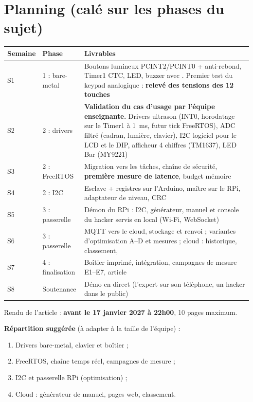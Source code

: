 \documentclass[11pt,a4paper]{article}
\newcommand{\code}[1]{\texttt{\detokenize{#1}}}
\begin{document}
\section{Planning (calé sur les phases du sujet)}
\label{sec:planning}

\begin{center}\small
\begin{tabularx}{\linewidth}{P{1.6cm}P{2.6cm}L}
\toprule
\textbf{Semaine} & \textbf{Phase} & \textbf{Livrables} \\
\midrule
S1 & 1 : bare-metal & Boutons lumineux PCINT2/PCINT0 + anti-rebond, Timer1 CTC, LED, buzzer avec \code{tone()}. Premier test du keypad analogique : \textbf{relevé des tensions des 12 touches} \\
S2 & 2 : drivers & \textbf{Validation du cas d'usage par l'équipe enseignante.} Drivers ultrason (INT0, horodatage sur le Timer1 à 1~ms, futur tick FreeRTOS), ADC filtré (cadran, lumière, clavier), I2C logiciel pour le LCD et le DIP, afficheur 4 chiffres (TM1637), LED Bar (MY9221) \\
S3 & 2 : FreeRTOS & Migration vers les tâches, chaîne de sécurité, \textbf{première mesure de latence}, budget mémoire \\
S4 & 2 : I2C & Esclave + registres sur l'Arduino, maître sur le RPi, adaptateur de niveau, CRC \\
S5 & 3 : passerelle & Démon du RPi : I2C, générateur, manuel et console du hacker servis en local (Wi-Fi, WebSocket) \\
S6 & 3 : passerelle & MQTT vers le cloud, stockage et renvoi ; variantes d'optimisation A--D et mesures ; cloud : historique, classement, \code{/live} \\
S7 & 4 : finalisation & Boîtier imprimé, intégration, campagnes de mesure E1--E7, article \\
S8 & Soutenance & Démo en direct (l'expert sur son téléphone, un hacker dans le public) \\
\bottomrule
\end{tabularx}
\end{center}

Rendu de l'article : \textbf{avant le 17 janvier 2027 à 22h00}, 10 pages maximum.

\textbf{Répartition suggérée} (à adapter à la taille de l'équipe) :

\begin{enumerate}
  \item Drivers bare-metal, clavier et boîtier ;
  \item FreeRTOS, chaîne temps réel, campagnes de mesure ;
  \item I2C et passerelle RPi (optimisation) ;
  \item Cloud : générateur de manuel, pages web, classement.
\end{enumerate}
\end{document}
